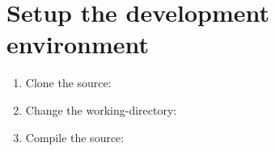 \section{Setup the development environment}
\begin{enumerate}
    \item Clone the source: 
    \item Change the working-directory: 
    \item Compile the source: 
\end{enumerate}
